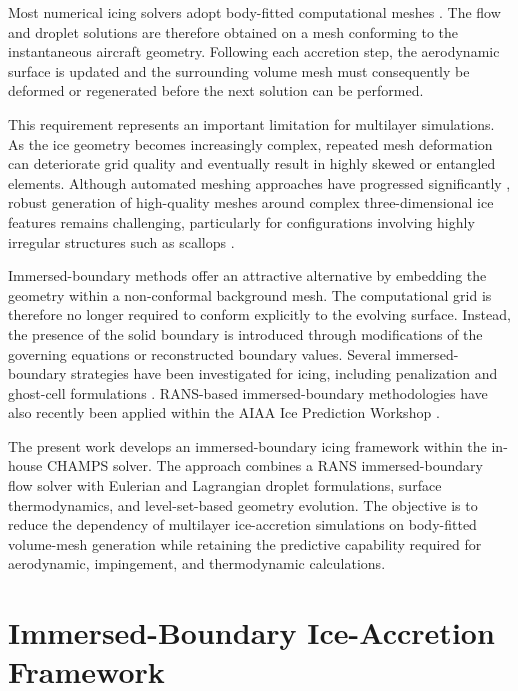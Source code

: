 \documentclass[letterpaper,times]{sae}
\begin{document}
Most numerical icing solvers adopt body-fitted computational meshes
\cite{laurendeau2022summary,laurendeau2024summary}. The flow and droplet
solutions are therefore obtained on a mesh conforming to the instantaneous
aircraft geometry. Following each accretion step, the aerodynamic surface is
updated and the surrounding volume mesh must consequently be deformed or
regenerated before the next solution can be performed.

This requirement represents an important limitation for multilayer
simulations. As the ice geometry becomes increasingly complex, repeated mesh
deformation can deteriorate grid quality and eventually result in highly
skewed or entangled elements. Although automated meshing approaches have
progressed significantly \cite{pointwiseHLPW5}, robust generation of
high-quality meshes around complex three-dimensional ice features remains
challenging, particularly for configurations involving highly irregular
structures such as scallops \cite{broeren2013aerodynamic}.

Immersed-boundary methods offer an attractive alternative by embedding the
geometry within a non-conformal background mesh. The computational grid is
therefore no longer required to conform explicitly to the evolving surface.
Instead, the presence of the solid boundary is introduced through
modifications of the governing equations or reconstructed boundary values.
Several immersed-boundary strategies have been investigated for icing,
including penalization and ghost-cell formulations
\cite{arquis1984conditions,lavoieEuler,lavoieDroplets,pabloIcing,capiGC}.
RANS-based immersed-boundary methodologies have also recently been applied
within the AIAA Ice Prediction Workshop
\cite{laurendeau2022summary,laurendeau2024summary,capi2022,capi2025}.

The present work develops an immersed-boundary icing framework within the
in-house \textsc{CHAMPS} solver. The approach combines a RANS
immersed-boundary flow solver with Eulerian and Lagrangian droplet
formulations, surface thermodynamics, and level-set-based geometry evolution.
The objective is to reduce the dependency of multilayer ice-accretion
simulations on body-fitted volume-mesh generation while retaining the
predictive capability required for aerodynamic, impingement, and
thermodynamic calculations.



\section{Immersed-Boundary Ice-Accretion Framework}
\end{document}
